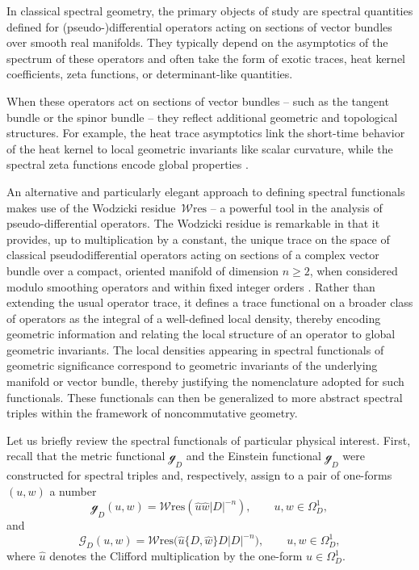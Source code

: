 \documentclass[pdftex]{sigma}
\numberwithin{equation}{section}
\theoremstyle{definition}
\def\W{\mathscr{W} \mathrm{res}}
\begin{document}
In classical spectral geometry, the primary objects of study are spectral quantities defined for (pseudo-)differential operators acting on sections of vector bundles over smooth real manifolds. They typically depend on the asymptotics of the spectrum of these operators and often take the form of exotic traces, heat kernel coefficients, zeta functions, or determinant-like quantities.

When these operators act on sections of vector bundles -- such as the tangent bundle or the spinor bundle -- they reflect additional geometric and topological structures. For example, the heat trace asymptotics link the short-time behavior of the heat kernel to local geometric invariants like scalar curvature, while the spectral zeta functions encode global properties \cite{Gilkey, Gilkey2}.

An alternative and particularly elegant approach to defining spectral functionals makes use of the Wodzicki residue~$\W$ -- a powerful tool in the analysis of pseudo-differential operators. The Wodzicki residue is remarkable in that it provides, up to multiplication by a constant, the unique trace on the space of classical pseudodifferential operators acting on sections of a complex vector bundle over a compact, oriented manifold of dimension $n\geq 2$, when considered modulo smoothing operators and within fixed integer orders \cite{Guillemin,Wodzicki}. Rather than extending the usual operator trace, it defines a trace functional on a broader class of operators as the integral of a well-defined local density, thereby encoding geometric information and relating the local structure of an operator to global geometric invariants. The local densities appearing in spectral functionals of geometric significance correspond to geometric invariants of the underlying manifold or vector bundle, thereby justifying the nomenclature adopted for such functionals. These functionals can then be generalized to more abstract spectral triples within the framework of noncommutative geometry.

Let us briefly review the spectral functionals of particular physical interest. First, recall that the metric functional $\mathscr{g}_D$ and the Einstein functional $\mathscr{g}_D$ were constructed for spectral triples \cite[Definition~5.4]{dabrowski2023} and, respectively, assign to a pair of one-forms $(u,w)$ a number
\[
	\mathscr{g}_D(u,w)=\W(\hat{u}\hat{w}|D|^{-n}), \qquad u,w\in \Omega_D^1,
\]
and
\[
	\mathscr{G}_D(u,w)=\W\bigl(\hat{u}\{D,\hat{w}\} D |D|^{-n}\bigr), \qquad u,w\in \Omega_D^1,
\]
where $\hat{u}$ denotes the Clifford multiplication by the one-form $u\in \Omega^1_D$.
\end{document}
